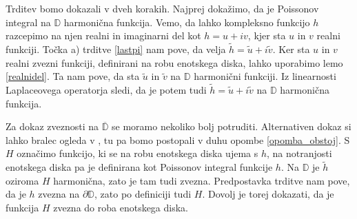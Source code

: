 \documentclass[mat1, tisk]{fmfdelo}
\begin{document}
     \begin{dokaz}
        Trditev bomo dokazali v dveh korakih. Najprej dokažimo, da je Poissonov integral na $\mathbb{D}$ harmonična funkcija.
        Vemo, da lahko kompleksno funkcijo $h$ razcepimo na njen realni in imaginarni del kot $h = u + iv$, kjer sta $u$ in $v$ realni funkciji. 
        Točka a) trditve \ref{lastpi} nam pove, da velja $\widetilde{h} = \widetilde{u} + i \widetilde{v}$.
        Ker sta $u$ in $v$ realni zvezni funkciji, definirani na robu enotskega diska, lahko uporabimo lemo \ref{realnidel}. Ta nam pove, da sta $\widetilde{u}$ in $\widetilde{v}$ na $\mathbb{D}$ harmonični funkciji. 
        Iz linearnosti Laplaceovega operatorja sledi, da je potem tudi $\widetilde{h} = \widetilde{u} + i \widetilde{v}$ na $\mathbb{D}$ harmonična funkcija.
        
        Za dokaz zveznosti na $\overline{\mathbb{D}}$ se moramo nekoliko bolj potruditi. Alternativen dokaz si lahko bralec ogleda v \cite[izrek 11.8. stran 234]{rudin}, tu pa bomo postopali v duhu opombe \ref{opomba_obstoj}. 
        S $H$ označimo funkcijo, ki se na robu enotskega diska ujema s $h$, na notranjosti enotskega diska pa je definirana kot Poissonov integral funkcije $h$. 
        Na  $\mathbb{D}$ je $\widetilde{h}$ oziroma $H$ harmonična, zato je tam tudi zvezna. Predpostavka trditve nam pove, da je $h$ zvezna na $\partial \mathbb{D}$, zato po definiciji tudi $H$. 
        Dovolj je torej dokazati, da je funkcija $H$ zvezna do roba enotskega diska.
        

\end{dokaz}
\end{document}
